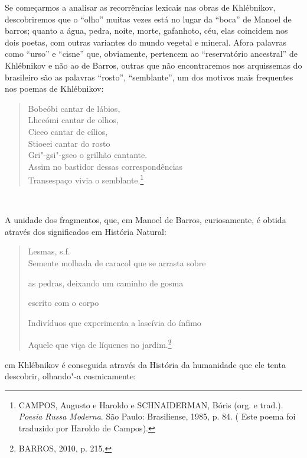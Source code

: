 Se começarmos a analisar as recorrências lexicais nas obras de
Khlébnikov, descobriremos que o ``olho'' muitas vezes está no lugar da
``boca'' de Manoel de barros; quanto a água, pedra, noite, morte,
gafanhoto, céu, elas coincidem nos dois poetas, com outras variantes do
mundo vegetal e mineral. Afora palavras como ``urso'' e ``cisne'' que,
obviamente, pertencem ao ``reservatório ancestral'' de Khlébnikov e não
ao de Barros, outras que não encontraremos nos arquissemas do brasileiro
são as palavras ``rosto'', ``semblante'', um dos motivos mais frequentes
nos poemas de Khlébnikov:

\begin{quote}
Bobeóbi cantar de lábios,\\
Lheeómi cantar de olhos,\\
Cieeo cantar de cílios,\\
Stioeei cantar do rosto\\
Gri"-gsi"-gseo o grilhão cantante.\\
\hspace*{0.333em}Assim no bastidor dessas correspondências\\
\hspace*{0.333em}Transespaço vivia o semblante.\footnote{CAMPOS, Augusto
  e Haroldo e SCHNAIDERMAN, Bóris (org. e trad.). \emph{Poesia Russa
  Moderna}. São Paulo: Brasiliense, 1985, p. 84. ( Este poema foi
  traduzido por Haroldo de Campos).}
\end{quote}

~~~~~~~~~~~~~

A unidade dos fragmentos, que, em Manoel de Barros, curiosamente, é
obtida através dos significados em História Natural:

\begin{quote}
Lesmas, s.f.~\\
Semente molhada de caracol que se arrasta sobre

as pedras, deixando um caminho de gosma

escrito com o corpo

Indivíduos que experimenta a lascívia do ínfimo

Aquele que viça de líquenes no jardim.\footnote{BARROS, 2010, p. 215.}
\end{quote}

em Khlébnikov é conseguida através da História da humanidade que ele
tenta descobrir, olhando"-a cosmicamente:

